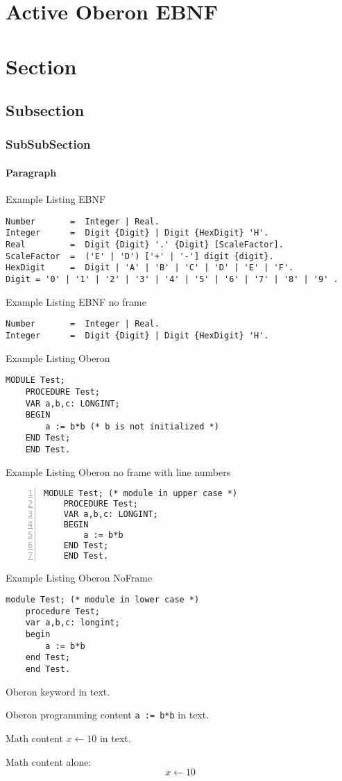 \documentclass[a4paper,11pt]{article}
\newcommand{\changefont}[3]{\fontfamily{#1}\fontseries{#2}\fontshape{#3}\selectfont}
\newcommand{\kwfont}{\changefont{pcr}{b}{n}}
\newcommand{\kw}[1]{\makebox{\kwfont #1}}
\begin{document}
\section{Active Oberon EBNF}



\section{Section}
\subsection{Subsection}
\subsubsection{SubSubSection}
\paragraph{Paragraph}

Example Listing EBNF
\begin{lstlisting}[language=ebnf]
Number       =  Integer | Real.
Integer      =  Digit {Digit} | Digit {HexDigit} 'H'.
Real         =  Digit {Digit} '.' {Digit} [ScaleFactor].
ScaleFactor  =  ('E' | 'D') ['+' | '-'] digit {digit}.
HexDigit     =  Digit | 'A' | 'B' | 'C' | 'D' | 'E' | 'F'.
Digit = '0' | '1' | '2' | '3' | '4' | '5' | '6' | '7' | '8' | '9' .
\end{lstlisting}

Example Listing EBNF no frame
\begin{lstlisting}[language=ebnf,frame=none]
Number       =  Integer | Real.
Integer      =  Digit {Digit} | Digit {HexDigit} 'H'.
\end{lstlisting}


Example Listing Oberon
\begin{lstlisting}[language=Oberon]
    MODULE Test;
    PROCEDURE Test;
    VAR a,b,c: LONGINT;
    BEGIN
        a := b*b (* b is not initialized *)
    END Test;
    END Test.
\end{lstlisting}

Example Listing Oberon no frame with line numbers
\begin{lstlisting}[language=Oberon,frame=none,numbers=left]
    MODULE Test; (* module in upper case *)
    PROCEDURE Test;
    VAR a,b,c: LONGINT;
    BEGIN
        a := b*b
    END Test;
    END Test.
\end{lstlisting}

Example Listing Oberon NoFrame
\begin{lstlisting}[language=Oberon,frame=none]
    module Test; (* module in lower case *)
    procedure Test;
    var a,b,c: longint;
    begin
        a := b*b
    end Test;
    end Test.
\end{lstlisting}

Oberon keyword \kw{module} in text.

Oberon programming content \verb+a := b*b+ in text.

Math content $x \leftarrow 10$ in text.

Math content alone:
$$x \leftarrow 10$$
\end{document}
